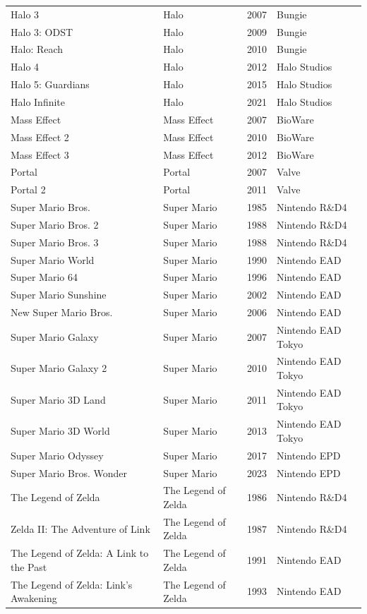 \begin{longtable}{p{6.5cm}p{3cm}lp{3.5cm}}
Halo 3 & Halo & 2007 & Bungie \\
Halo 3: ODST & Halo & 2009 & Bungie \\
Halo: Reach & Halo & 2010 & Bungie \\
Halo 4 & Halo & 2012 & Halo Studios \\
Halo 5: Guardians & Halo & 2015 & Halo Studios \\
Halo Infinite & Halo & 2021 & Halo Studios \\
Mass Effect & Mass Effect & 2007 & BioWare \\
Mass Effect 2 & Mass Effect & 2010 & BioWare \\
Mass Effect 3 & Mass Effect & 2012 & BioWare \\
Portal & Portal & 2007 & Valve \\
Portal 2 & Portal & 2011 & Valve \\
Super Mario Bros. & Super Mario & 1985 & Nintendo R\&D4 \\
Super Mario Bros. 2 & Super Mario & 1988 & Nintendo R\&D4 \\
Super Mario Bros. 3 & Super Mario & 1988 & Nintendo R\&D4 \\
Super Mario World & Super Mario & 1990 & Nintendo EAD \\
Super Mario 64 & Super Mario & 1996 & Nintendo EAD \\
Super Mario Sunshine & Super Mario & 2002 & Nintendo EAD \\
New Super Mario Bros. & Super Mario & 2006 & Nintendo EAD \\
Super Mario Galaxy & Super Mario & 2007 & Nintendo EAD Tokyo \\
Super Mario Galaxy 2 & Super Mario & 2010 & Nintendo EAD Tokyo \\
Super Mario 3D Land & Super Mario & 2011 & Nintendo EAD Tokyo \\
Super Mario 3D World & Super Mario & 2013 & Nintendo EAD Tokyo \\
Super Mario Odyssey & Super Mario & 2017 & Nintendo EPD \\
Super Mario Bros. Wonder & Super Mario & 2023 & Nintendo EPD \\
The Legend of Zelda & The Legend of Zelda & 1986 & Nintendo R\&D4 \\
Zelda II: The Adventure of Link & The Legend of Zelda & 1987 & Nintendo R\&D4 \\
The Legend of Zelda: A Link to the Past & The Legend of Zelda & 1991 & Nintendo EAD \\
The Legend of Zelda: Link's Awakening & The Legend of Zelda & 1993 & Nintendo EAD \\

\end{longtable}
